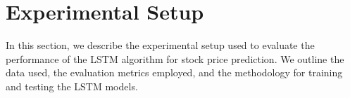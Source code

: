 \documentclass[conference]{IEEEtran}
\begin{document}






\section{Experimental Setup}

In this section, we describe the experimental setup used to evaluate the performance of the LSTM algorithm for stock price prediction. We outline the data used, the evaluation metrics employed, and the methodology for training and testing the LSTM models.
\end{document}
